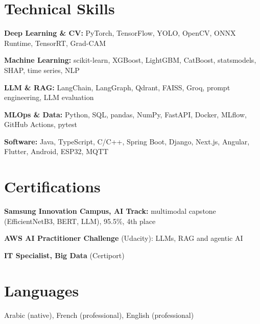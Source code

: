 \documentclass[a4paper,11pt]{article}
\begin{document}
\section{Technical Skills}
\small
\textbf{Deep Learning \& CV:} PyTorch, TensorFlow, YOLO, OpenCV, ONNX Runtime, TensorRT, Grad-CAM\par\vspace{2pt}
\textbf{Machine Learning:} scikit-learn, XGBoost, LightGBM, CatBoost, statsmodels, SHAP, time series, NLP\par\vspace{2pt}
\textbf{LLM \& RAG:} LangChain, LangGraph, Qdrant, FAISS, Groq, prompt engineering, LLM evaluation\par\vspace{2pt}
\textbf{MLOps \& Data:} Python, SQL, pandas, NumPy, FastAPI, Docker, MLflow, GitHub Actions, pytest\par\vspace{2pt}
\textbf{Software:} Java, TypeScript, C/C++, Spring Boot, Django, Next.js, Angular, Flutter, Android, ESP32, MQTT\par
\normalsize

\section{Certifications}
\small
\textbf{Samsung Innovation Campus, AI Track:} multimodal capstone (EfficientNetB3, BERT, LLM), 95.5\%, 4th place\par\vspace{2pt}
\textbf{AWS AI Practitioner Challenge} (Udacity): LLMs, RAG and agentic AI\par\vspace{2pt}
\textbf{IT Specialist, Big Data} (Certiport)\par
\normalsize

\section{Languages}
\small Arabic (native), French (professional), English (professional)
\end{document}
